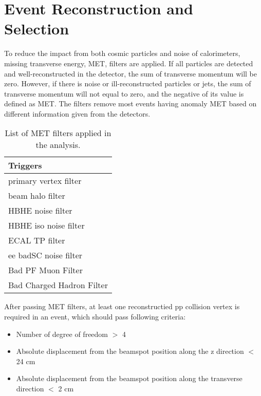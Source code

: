 \section{Event Reconstruction and Selection} \label{Event reconstruction and selection}
To reduce the impact from both cosmic particles and noise of calorimeters, missing transverse energy, MET, filters are applied.
If all particles are detected and well-reconstructed in the detector, the sum of transverse momentum will be zero. However, if there is noise or ill-reconstructed particles or jets, the sum of transverse momentum will not equal to zero, and the negative of its value is defined as MET.  
The filters remove most events having anomaly MET based on different information given from the detectors.
\begin{table}[h!]
  \begin{center}
    \begin{tabular}{l}
    Triggers \\
    \hline
    primary vertex filter\\
    beam halo filter\\
    HBHE noise filter\\
    HBHE iso noise filter\\
    ECAL TP filter\\
    ee badSC noise filter\\
	Bad PF Muon Filter\\
	Bad Charged Hadron Filter\\ 
    \hline
    \end{tabular}
  \end{center}

  \caption{List of MET filters applied in the analysis.}
\end{table}

After passing MET filters, at least one reconstructied pp collision vertex is required in an event, which should pass following criteria:
\begin{itemize}[noitemsep]
\item Number of degree of freedom $>$ 4
\item Absolute displacement from the beamspot position along the z direction $<$ 24 cm
\item Absolute displacement from the beamspot position along the transverse direction $<$ 2 cm
\end{itemize}


